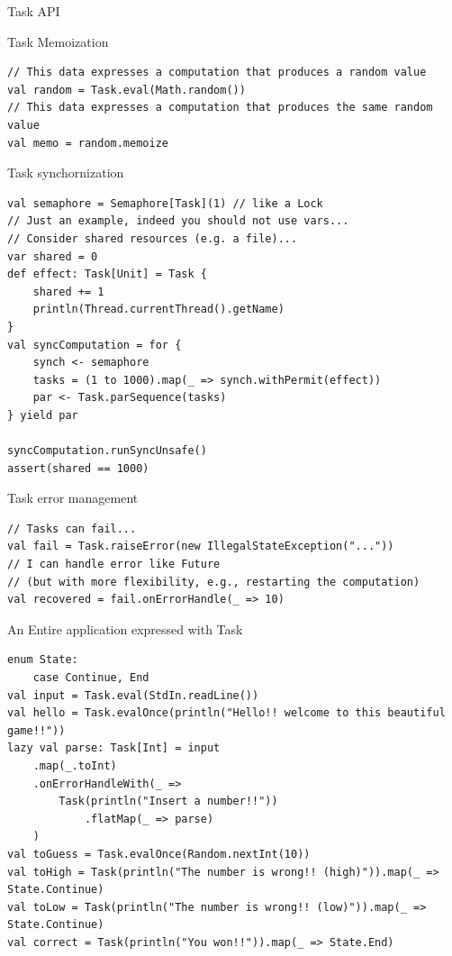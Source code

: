 \documentclass[presentation, 9pt]{beamer}\mode<presentation>{\usetheme{AMSBolognaFC}}
\begin{document}
\begin{frame}{Task API}
\begin{alertblock}{Task Memoization}
\begin{tcolorbox}[left=0pt, top=0pt, bottom=0pt]
								 \begin{verbatim}
// This data expresses a computation that produces a random value
val random = Task.eval(Math.random())
// This data expresses a computation that produces the same random value
val memo = random.memoize
								 \end{verbatim}
							 \end{tcolorbox}
					 \end{alertblock}
					 \begin{alertblock}{Task synchornization}
						\begin{tcolorbox}[left=0pt, top=0pt, bottom=0pt]
									 \begin{verbatim}
val semaphore = Semaphore[Task](1) // like a Lock
// Just an example, indeed you should not use vars... 
// Consider shared resources (e.g. a file)...
var shared = 0 
def effect: Task[Unit] = Task {
	shared += 1
	println(Thread.currentThread().getName)
}
val syncComputation = for {
	synch <- semaphore
	tasks = (1 to 1000).map(_ => synch.withPermit(effect))
	par <- Task.parSequence(tasks)
} yield par

syncComputation.runSyncUnsafe()
assert(shared == 1000)
									 \end{verbatim}
								 \end{tcolorbox}
						 \end{alertblock}
\begin{alertblock}{Task error management}
	\begin{tcolorbox}[left=0pt, top=0pt, bottom=0pt]
										 \begin{verbatim}
// Tasks can fail...
val fail = Task.raiseError(new IllegalStateException("..."))
// I can handle error like Future 
// (but with more flexibility, e.g., restarting the computation)
val recovered = fail.onErrorHandle(_ => 10)
										 \end{verbatim}
									 \end{tcolorbox}
							 \end{alertblock}
\begin{alertblock}{An Entire application expressed with Task}
	\begin{tcolorbox}[left=0pt, top=0pt, bottom=0pt]
					\begin{verbatim}
enum State:
	case Continue, End
val input = Task.eval(StdIn.readLine())
val hello = Task.evalOnce(println("Hello!! welcome to this beautiful game!!"))
lazy val parse: Task[Int] = input
	.map(_.toInt)
	.onErrorHandleWith(_ =>
		Task(println("Insert a number!!"))
			.flatMap(_ => parse)
	)
val toGuess = Task.evalOnce(Random.nextInt(10))
val toHigh = Task(println("The number is wrong!! (high)")).map(_ => State.Continue)
val toLow = Task(println("The number is wrong!! (low)")).map(_ => State.Continue)
val correct = Task(println("You won!!")).map(_ => State.End)


\end{verbatim}
\end{tcolorbox}
\end{alertblock}
\end{frame}
\end{document}
